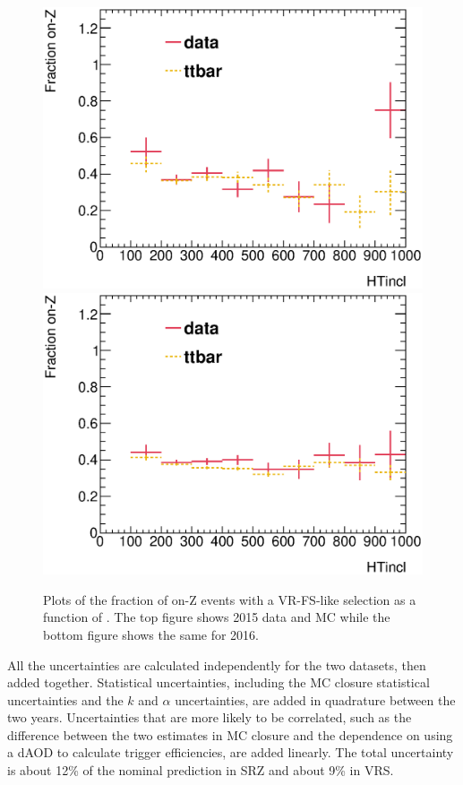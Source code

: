 \begin{centering}
\begin{figure}[!hbt]
\myfloatalign
\includegraphics[width=.85\linewidth]{figures/fs/frac_vs_ht_2015.eps}
\includegraphics[width=.85\linewidth]{figures/fs/frac_vs_ht_2016.eps}
\caption{Plots of the fraction of on-Z events with a VR-FS-like selection as a function of \HT. The top figure shows 2015 data and \ac{MC} while the bottom figure shows the same for 2016.}
\label{fig:fs_frac_ht}
\end{figure}
\end{centering}

All the uncertainties are calculated independently for the two datasets, then added together. Statistical uncertainties, including the \ac{MC} closure statistical uncertainties and the $k$ and $\alpha$ uncertainties, are added in quadrature between the two years. Uncertainties that are more likely to be correlated, such as the difference between the two estimates in \ac{MC} closure and the dependence on using a dAOD to calculate trigger efficiencies, are added linearly. The total uncertainty is about 12\% of the nominal prediction in SRZ and about 9\% in VRS. 

